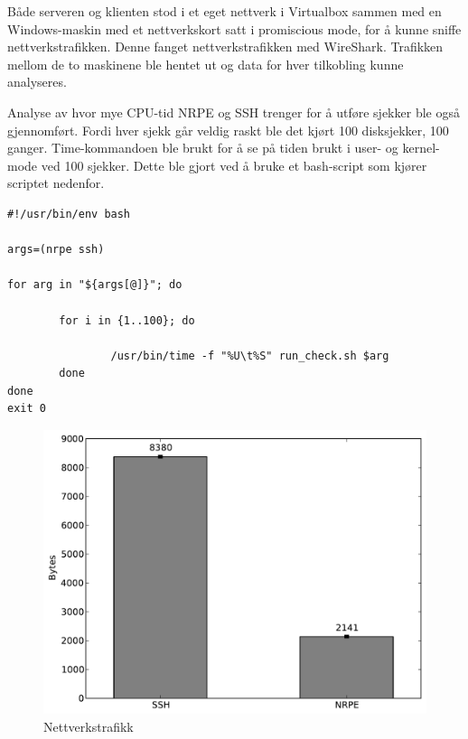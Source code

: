 Både serveren og klienten stod i et eget nettverk i Virtualbox sammen med en Windows-maskin med et nettverkskort satt i promiscious mode, for å kunne sniffe nettverkstrafikken. Denne fanget nettverkstrafikken med WireShark. Trafikken mellom de to maskinene ble hentet ut og data for hver tilkobling kunne analyseres.

Analyse av hvor mye CPU-tid NRPE og SSH trenger for å utføre sjekker ble også gjennomført. Fordi hver sjekk går veldig raskt ble det kjørt 100 disksjekker, 100 ganger. Time-kommandoen ble brukt for å se på tiden brukt i user- og kernel-mode ved 100 sjekker. Dette ble gjort ved å bruke et bash-script som kjører scriptet nedenfor.

\begin{lstlisting}[style=example]
#!/usr/bin/env bash

args=(nrpe ssh)

for arg in "${args[@]}"; do

        for i in {1..100}; do

                /usr/bin/time -f "%U\t%S" run_check.sh $arg
        done
done
exit 0
\end{lstlisting}

\begin{figure}[H]
    \centering
    \includegraphics[scale=0.6]{img/nettverkstrafikk}
    \caption{Nettverkstrafikk}
    \label{network_traffic}
\end{figure}

